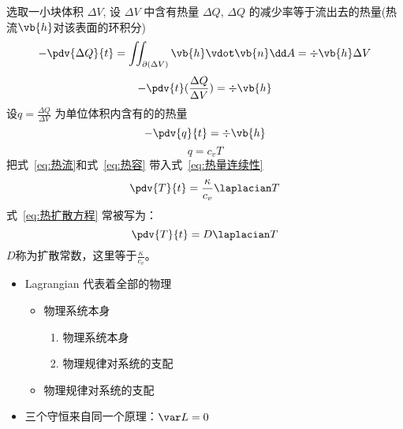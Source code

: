 选取一小块体积 \( \Delta V \), 设 \( \Delta V \) 中含有热量 \( \Delta Q \), \( \Delta Q \) 的减少率等于流出去的热量(热流\( \vb{h} \)对该表面的环积分)
\begin{equation}
	-	\pdv{\Delta Q}{t} = \iint_{\partial (\Delta V)} \vb{h} \vdot \vb{n} \dd A = \div \vb{h} \Delta V
\end{equation}
\begin{equation*}
	-\pdv{t}(\frac{\Delta Q}{\Delta V}) = \div \vb{h}
\end{equation*}
设\( q = \frac{\Delta Q}{\Delta V} \) 为单位体积内含有的的热量
\begin{equation}
	-\pdv{q}{t} = \div \vb{h}
	\label{eq:热量连续性}
\end{equation}
\begin{equation}
	q = c_v T
	\label{eq:热容}
\end{equation}
把式~\eqref{eq:热流}和式~\eqref{eq:热容} 带入式~\eqref{eq:热量连续性}
\begin{equation}
	\pdv{T}{t} = \frac{\kappa}{c_v} \laplacian T
	\label{eq:热扩散方程}
\end{equation}
式~\eqref{eq:热扩散方程} 常被写为：
\begin{equation}
	\pdv{T}{t} =  D \laplacian T
\end{equation}
\( D \)称为扩散常数，这里等于\( \frac{\kappa}{c_v} \)。

\begin{itemize}
	\item Lagrangian 代表着全部的物理
	      \begin{itemize}
		      \item 物理系统本身
		            \begin{enumerate}
			            \item 物理系统本身
			            \item 物理规律对系统的支配
		            \end{enumerate}
		      \item 物理规律对系统的支配
	      \end{itemize}
	\item 三个守恒来自同一个原理：\( \var L = 0 \)
\end{itemize}


